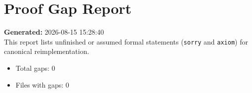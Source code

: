 \documentclass[11pt]{article}
\begin{document}
\section*{Proof Gap Report}
\textbf{Generated:} 2026-08-15 15:28:40\\
This report lists unfinished or assumed formal statements (\texttt{sorry} and \texttt{axiom}) for canonical reimplementation.
\begin{itemize}[leftmargin=2em]
\item Total gaps: 0
\item Files with gaps: 0
\end{itemize}
\end{document}
